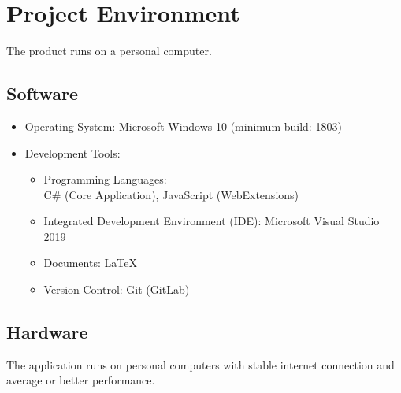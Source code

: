 \chapter{Project Environment}
\label{ch:environment}

The product runs on a personal computer.

\section{Software}
\begin{itemize}
\item[] Operating System: Microsoft Windows 10 (minimum build: 1803)

\item[] Development Tools:
	\begin{itemize}
	\item Programming Languages: \\C\# (Core Application), JavaScript (WebExtensions)
	\item Integrated Development Environment (IDE): Microsoft Visual Studio 2019
	\item Documents: LaTeX
	\item Version Control: Git (GitLab)
	\end{itemize}
\end{itemize}
\section{Hardware}

The application runs on personal computers with stable internet connection and average or better performance.